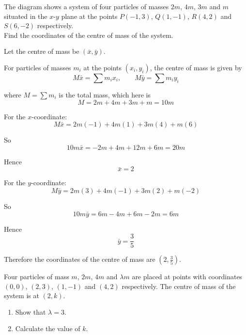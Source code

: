 \documentclass[leqno]{article}
\begin{document}
\begin{enumerate}[
  label=\textbf{\arabic*.},
  leftmargin=*,
  topsep=0pt,
  partopsep=0pt,
  parsep=0pt
]
\begin{figure}[H]
\end{figure}


The diagram shows a system of four particles of masses $2m$, $4m$, $3m$ and $m$ situated in the $x$-$y$ plane at the points $P(-1,3)$, $Q(1,-1)$, $R(4,2)$ and $S(6,-2)$ respectively. \\

Find the coordinates of the centre of mass of the system.  \\

\vspace*{10pt}

\begin{djsSolution}
Let the centre of mass be \((\bar x,\bar y)\).

For particles of masses \(m_i\) at the points \((x_i,y_i)\), the centre of mass is given by
\[
M\bar{x}=\sum m_ix_i,\qquad M\bar{y}=\sum m_iy_i
\]

where \(M=\sum m_i\) is the total mass, which here is
\[
M=2m+4m+3m+m=10m
\]

For the \(x\)-coordinate:
\[
M\bar x=2m(-1)+4m(1)+3m(4)+m(6)
\]

So
\[
10m\bar x=-2m+4m+12m+6m=20m
\]

Hence
\[
\bar x=2
\]

For the \(y\)-coordinate:
\[
M\bar y=2m(3)+4m(-1)+3m(2)+m(-2)
\]

So
\[
10m\bar y=6m-4m+6m-2m=6m
\]

Hence
\[
\bar y=\frac{3}{5}
\]

Therefore the coordinates of the centre of mass are \((2,\tfrac{3}{5})\).
\end{djsSolution}


\newpage

\questionitem

Four particles of mass $m$, $2m$, $4m$ and $\lambda m$ are placed at points with coordinates $(0,0)$, $(2,3)$, $(1,-1)$ and $(4,2)$ respectively. The centre of mass of the system is at $(2,k)$. \\

\begin{enumerate}[label=\textbf{(\alph*)}]
  \item Show that $\lambda = 3$.  \\
  \item Calculate the value of $k$.  \\
\end{enumerate}


\end{enumerate}
\end{document}
